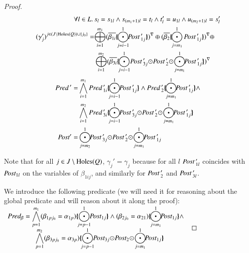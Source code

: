 \documentclass{elsarticle}
\newcommand{\shortotimes}{\!\otimes\!}
\newcommand{\shortodot}{\!\odot\!}
\begin{document}
\begin{proof}
{\small \begin{align*}
\forall l\in L.\,&s_l=s_{1l} \wedge s_{(m_1+1)l}=t_l \wedge t'_l = u_{1l} \wedge u_{(m_2+1)l}=s'_l\\
{(\gamma_j')}^{j\in (J\setminus \Holes(Q)) \cup \{j_0\}}=&\displaystyle{\bigoplus_{i=1}^{m_1} \vis{\set{\beta_{1i}}\subst{\bigodot_{j=i-1}^{1}\!\!\Post\,'_{1j}}}\oplus  \vis{\set{\beta_{2}}\subst{\bigodot_{j=m_1}^{1}\Post\,'_{1j}}}} \oplus\\
& \bigoplus_{i=1}^{m_2}
\vis{\set{\beta_{3i}} \subst{\bigodot_{j=i-1}^{1}\!\Post\,'_{3j}\shortodot\Post\,'_2\shortodot\bigodot_{j=m_1}^{1}\!\!\Post\,'_{1j}} }
\end{align*}}
{\small \begin{align*}
\Pred\,'=&\bigwedge_{i=1}^{m_1}\Pred\,'_{1i}\subst{\bigodot_{j=i-1}^{1}\!\!\Post\,'_{1j}}\land\Pred\,'_2 \subst{\bigodot_{j=m_1}^{1}\!\!\Post\,'_{1j}}\land\\ 
&\bigwedge_{i=1}^{m_2}\Pred\,'_{3i}\subst{\bigodot_{j=i-1}^{1}\!\!\Post\,'_{3j}\shortodot\Post\,'_2\shortodot\bigodot_{j=m_1}^{1}\!\!\Post\,'_{1j}}\\
\Post'=&\bigodot_{j=m_2}^{1}\!\!\Post\,'_{3j}\shortodot\Post\,'_2\shortodot\bigodot_{j=m_1}^{1}\!\!\Post\,'_{1j}
\end{align*}}

 

Note that for all $j\in J\setminus \operatorname{Holes}(Q)$, $\gamma_j' = \gamma_j$ because for all $l$ $\Post\,'_{1l}$ coincides with $\Post_{1l}$ on the variables of $\beta_{1ij}$, and similarly for $\Post\,'_2$ and $\Post\,'_{3l}$.

We introduce the following predicate (we will need it for reasoning about the global predicate and will reason about it along the proof):\\
$\begin{array}{l}\displaystyle{
\Pred_\beta=\bigwedge_{p=1}^{m_1}(\beta_{1pj_0}=\alpha_{1p})\subst{\bigodot_{j=p-1}^{1}\!\!\Post_{1j}} \wedge (\beta_{2j_0}=\alpha_{21})\subst{\bigodot_{j=m_1}^{1}\!\!\Post_{1j}}} \wedge \\\qquad\qquad
\displaystyle{
\bigwedge_{p=1}^{m_2}(\beta_{3pj_0}=\alpha_{3p})
\subst{\bigodot_{j=p-1}^{1}\!\!\Post_{3j}\shortodot\Post_2\shortodot\bigodot_{j=m_1}^{1}\!\!\Post_{1j}}}
\end{array}$



\end{proof}
\end{document}
